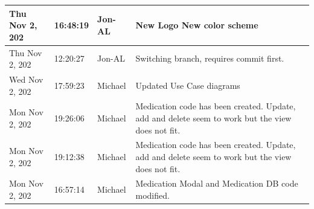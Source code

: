 \documentclass[11pt]{article}
\begin{document}
\begin{center}
\begin{longtable}{|p{2.7cm}|l|p{2cm}|p{8cm}|}
           \hline Thu Nov 2,  202                              & 16:48:19                           & Jon-AL                                  & New Logo New color scheme                                                                                                                                                                                                                                                                                  \\
           \hline Thu Nov 2,  202                              & 12:20:27                           & Jon-AL                                  & Switching branch, requires commit first.                                                                                                                                                                                                                                                                   \\
           \hline Wed Nov 2,  202                              & 17:59:23                           & Michael                                 & Updated Use Case diagrams                                                                                                                                                                                                                                                                                  \\
           \hline Mon Nov 2,  202                              & 19:26:06                           & Michael                                 & Medication code has been created. Update, add and delete seem to work but the view does not fit.                                                                                                                                                                                                           \\
           \hline Mon Nov 2,  202                              & 19:12:38                           & Michael                                 & Medication code has been created. Update, add and delete seem to work but the view does not fit.                                                                                                                                                                                                           \\
           \hline Mon Nov 2,  202                              & 16:57:14                           & Michael                                 & Medication Modal and Medication DB code modified.                                                                                                                                                                                                                                                          \\

\end{longtable}
\end{center}
\end{document}
